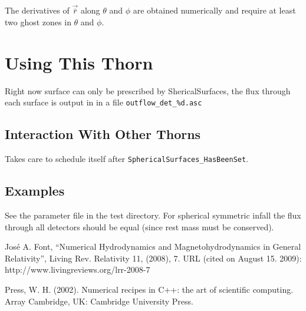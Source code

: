 The derivatives of $\vec{\bar r}$ along $\theta$ and $\phi$ are obtained
numerically and require at least two ghost zones in $\theta$ and $\phi$.

\section{Using This Thorn}
Right now surface can only be prescribed by ShericalSurfaces, the flux through
each surface is output in in a file \verb|outflow_det_%d.asc|

\subsection{Interaction With Other Thorns}
Takes care to schedule itself after \verb|SphericalSurfaces_HasBeenSet|.

\subsection{Examples}
See the parameter file in the test directory. For spherical symmetric infall
the flux through all detectors should be equal (since rest mass must be
conserved).

\begin{thebibliography}{9}
     Jos\'e A. Font,
    ``Numerical Hydrodynamics and Magnetohydrodynamics in General Relativity'',
    Living Rev. Relativity 11,  (2008),  7. URL (cited on August 15. 2009):
    http://www.livingreviews.org/lrr-2008-7

     Press, W. H. (2002). Numerical recipes in C++: the
        art of scientific computing. Array Cambridge, UK: Cambridge University
        Press. 
\end{thebibliography}



